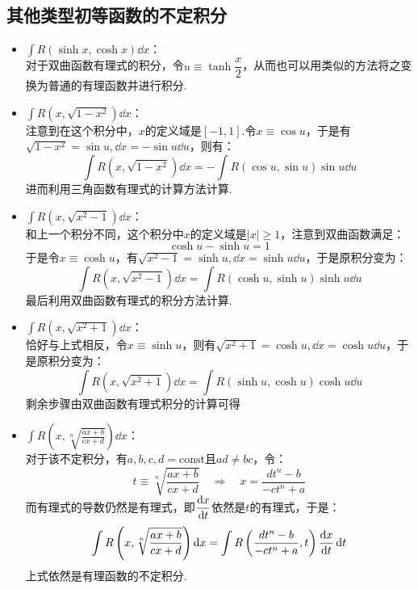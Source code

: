 \subsection{其他类型初等函数的不定积分}
\begin{itemize}
    \item $\displaystyle\int R(\sinh x,\cosh x) \dd{x}$：\\[0.5em]
    对于双曲函数有理式的积分，令$u \equiv \tanh \dfrac{x}{2}$，从而也可以用类似的方法将之变换为普通的有理函数并进行积分.

    \item $\displaystyle\int R(x,\sqrt{1-x^2}) \dd{x}$：\\[0.5em]
    注意到在这个积分中，$x$的定义域是$[-1,1]$.令$x \equiv \cos u$，于是有$\sqrt{1-x^2} = \sin u,\dd{x} = -\sin u \dd{u}$，则有：
    \[\int R(x,\sqrt{1-x^2}) \dd{x} = -\int R(\cos u,\sin u)\sin u \dd{u}\]
    进而利用三角函数有理式的计算方法计算.

    \item $\displaystyle\int R(x,\sqrt{x^2-1}) \dd{x}$：\\[0.5em]
    和上一个积分不同，这个积分中$x$的定义域是$|x|\geqslant 1$，注意到双曲函数满足：
    \[\cosh u - \sinh u = 1\]
    于是令$x \equiv \cosh u$，有$\sqrt{x^2-1} = \sinh u,\dd{x} = \sinh u \dd{u}$，于是原积分变为：
    \[\int R(x,\sqrt{x^2-1}) \dd{x} = \int R(\cosh u,\sinh u) \sinh u \dd{u}\]
    最后利用双曲函数有理式的积分方法计算.

    \item $\displaystyle\int R(x,\sqrt{x^2+1}) \dd{x}$：\\[0.5em]
    恰好与上式相反，令$x \equiv \sinh u$，则有$\sqrt{x^2+1} = \cosh u,\dd{x} = \cosh u \dd{u}$，于是原积分变为：
    \[\int R(x,\sqrt{x^2+1}) \dd{x} = \int R(\sinh u,\cosh u) \cosh u \dd{u}\]
    剩余步骤由双曲函数有理式积分的计算可得

    \item $\displaystyle\int R\left(x,\sqrt[n]{\frac{ax+b}{cx+d}}\right)\dd{x}$：\\[0.5em]
    对于该不定积分，有$a,b,c,d = \text{const}$且$ad \neq bc$，令：
    \[t \equiv \sqrt[n]{\frac{ax+b}{cx+d}} \quad\Rightarrow\quad x = \frac{dt^n - b}{-ct^n + a}\]
    而有理式的导数仍然是有理式，即$\displaystyle\dv{x}{t}$依然是$t$的有理式，于是：
    \[\int R\left(x,\sqrt[n]{\frac{ax+b}{cx+d}}\right)\dd{x} = \int R\left(\frac{dt^n - b}{-ct^n + a},t\right)\dv{x}{t}\dd{t}\]
    上式依然是有理函数的不定积分.
\end{itemize}